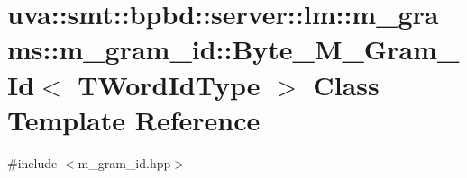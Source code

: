 \hypertarget{classuva_1_1smt_1_1bpbd_1_1server_1_1lm_1_1m__grams_1_1m__gram__id_1_1_byte___m___gram___id}{}\section{uva\+:\+:smt\+:\+:bpbd\+:\+:server\+:\+:lm\+:\+:m\+\_\+grams\+:\+:m\+\_\+gram\+\_\+id\+:\+:Byte\+\_\+\+M\+\_\+\+Gram\+\_\+\+Id$<$ T\+Word\+Id\+Type $>$ Class Template Reference}
\label{classuva_1_1smt_1_1bpbd_1_1server_1_1lm_1_1m__grams_1_1m__gram__id_1_1_byte___m___gram___id}


{\ttfamily \#include $<$m\+\_\+gram\+\_\+id.\+hpp$>$}


